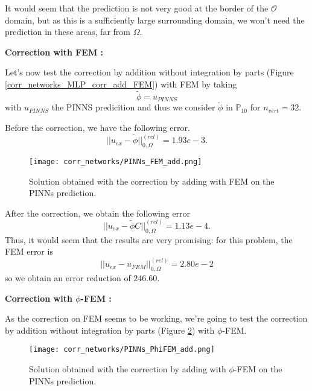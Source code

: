 \begin{Rem}
	It would seem that the prediction is not very good at the border of the $\mathcal{O}$ domain, but as this is a sufficiently large surrounding domain, we won't need the prediction in these areas, far from $\Omega$.
\end{Rem}

\textbf{Correction with FEM :}

Let's now test the correction by addition without integration by parts (Figure \ref{corr_networks_MLP_corr_add_FEM}) with FEM by taking
\begin{equation*}
	\tilde{\phi}=u_{PINNS}
\end{equation*}
with $u_{PINNS}$ the PINNS predicition and thus we consider $\tilde{\phi}$ in $\mathbb{P}_{10}$ for $n_{vert}=32$.

Before the correction, we have the following error. 
\begin{equation*}
	||u_{ex}-\tilde{\phi}||_{0,\Omega}^{(rel)}=1.93e-3.
\end{equation*}

\begin{figure}[H]
	\centering
	\texttt{[image: corr\_networks/PINNs\_FEM\_add.png]}
	\caption{Solution obtained with the correction by adding with FEM on the PINNs prediction.}
	\label{corr_networks_PINNS_corr_add_FEM}
\end{figure}

After the correction, we obtain the following error 
\begin{equation*}
	||u_{ex}-\tilde{\phi}C||_{0,\Omega}^{(rel)}=1.13e-4.
\end{equation*}
Thus, it would seem that the results are very promising: for this problem, the FEM error is 
\begin{equation*}
	||u_{ex}-u_{FEM}||_{0,\Omega}^{(rel)}=2.80e-2
\end{equation*}
so we obtain an error reduction of $246.60$.

\textbf{Correction with $\phi$-FEM :}

As the correction on FEM seems to be working, we're going to test the correction by addition without integration by parts (Figure \ref{corr_networks_PINNs_corr_add_PhiFEM}) with $\phi$-FEM.

\begin{figure}[H]
	\centering
	\texttt{[image: corr\_networks/PINNs\_PhiFEM\_add.png]}
	\caption{Solution obtained with the correction by adding with $\phi$-FEM on the PINNs prediction.}
	\label{corr_networks_PINNs_corr_add_PhiFEM}
\end{figure}

